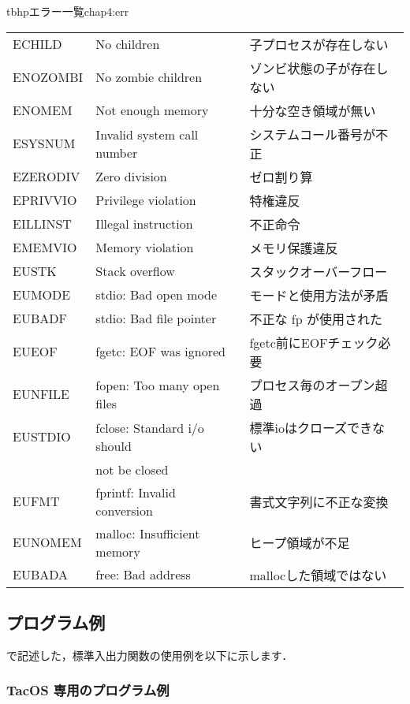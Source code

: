 \begin{mytable}{tbhp}{エラー一覧}{chap4:err}
\begin{tabular}{l|l|l}
ECHILD    & No children                 & 子プロセスが存在しない \\
ENOZOMBI  & No zombie children          & ゾンビ状態の子が存在しない \\
ENOMEM    & Not enough memory           & 十分な空き領域が無い \\
ESYSNUM   & Invalid system call number  & システムコール番号が不正 \\
EZERODIV  & Zero division               & ゼロ割り算 \\
EPRIVVIO  & Privilege violation         & 特権違反 \\
EILLINST  & Illegal instruction         & 不正命令 \\
EMEMVIO   & Memory violation            & メモリ保護違反 \\
EUSTK     & Stack overflow              & スタックオーバーフロー \\
EUMODE    & stdio: Bad open mode        & モードと使用方法が矛盾 \\
EUBADF    & stdio: Bad file pointer     & 不正な fp が使用された \\
EUEOF     & fgetc: EOF was ignored      & fgetc前にEOFチェック必要 \\
EUNFILE   & fopen: Too many open files  & プロセス毎のオープン超過 \\
EUSTDIO   & fclose: Standard i/o should & 標準ioはクローズできない \\
          &  not be closed              &                          \\
EUFMT     & fprintf: Invalid conversion & 書式文字列に不正な変換 \\
EUNOMEM   & malloc: Insufficient memory & ヒープ領域が不足 \\
EUBADA    & free: Bad address           & mallocした領域ではない \\
\end{tabular}
\end{mytable}

\subsection{プログラム例}

\cmml で記述した，標準入出力関数の使用例を以下に示します．

\subsubsection{TacOS 専用のプログラム例}


